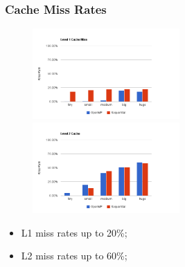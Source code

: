 \documentclass{beamer}
\begin{document}
\begin{frame}
	\frametitle{Cache Miss Rates}

\begin{figure}
\begin{center}
\includegraphics[width=0.5\textwidth]{images/pfac/chrtl1.png}
\includegraphics[width=0.5\textwidth]{images/pfac/chrtl2.png}
\end{center}
\end{figure}

\begin{itemize}
\item{L1 miss rates up to 20\%;}
\item{L2 miss rates up to 60\%;}
\end{itemize}

\end{frame}
\end{document}
